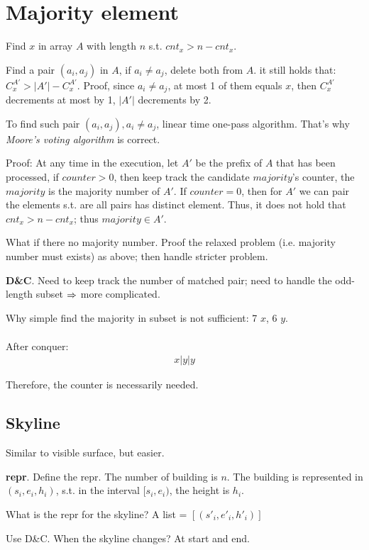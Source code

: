 \documentclass[a4paper]{report}
\theoremstyle{definition}
\begin{document}
\section{Majority element}
Find $x$ in array $A$ with length $n$ s.t. $cnt_x > n -cnt_x$.

Find a pair $(a_i, a_j)$ in $A$, if $a_i \neq a_j$, delete both from $A$. it still holds that: $C^{A'}_x > |A'|-C^{A'}_x$. Proof, since $a_i\neq a_j$, at most 1 of them equals $x$, then $C^{A'}_x$ decrements at most by 1, $|A'|$ decrements by 2.

To find such pair $(a_i, a_j), a_i\neq a_j$, linear time one-pass algorithm. That's why \textit{Moore's voting algorithm} is correct.

Proof: At any time in the execution, let $A'$ be the prefix of $A$ that has been processed, if $counter>0$, then keep track the candidate $majority$'s counter, the $majority$ is the majority number of $A'$.  If $counter =0$, then for $A'$ we can pair the elements s.t. are all pairs has distinct element. Thus, it does not hold that $cnt_x>n-cnt_x$; thus $majority\in A'$.

What if there no majority number. Proof the relaxed problem (i.e. majority number must exists) as above; then handle stricter problem.

\textbf{D\&C}. Need to keep track the number of matched pair; need to handle the odd-length subset $\Rightarrow$ more complicated.

Why simple find the majority in subset is not sufficient: 7 $x$, 6 $y$.
\begin{align*}
[(x, x) (x, x) (y,x)][(y, x) (y, x) (y, y)][y]
\end{align*}

After conquer:
\begin{align*}
x | y|y
\end{align*}

Therefore, the counter is necessarily needed. 
\subsection{Skyline}
Similar to visible surface, but easier.

\textbf{repr}. Define the repr. The number of building is $n$. The building is represented in $(s_{i}, e_{i},h_{i})$, s.t. in the interval $[s_i, e_i)$, the height is $h_i$.

What is the repr for the skyline? A list = $[(s'_i, e'_i, h'_i)]$


Use D\&C. When the skyline changes? At start and end.
\end{document}
